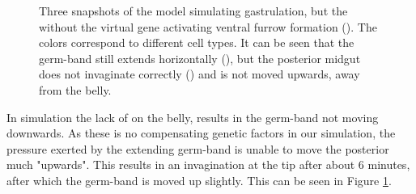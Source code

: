 \begin{figure}[H]
    \centering

    \caption{Three snapshots of the model simulating gastrulation, but the without the virtual gene activating ventral furrow formation (). The colors correspond to different cell types. It can be seen that the germ-band still extends horizontally (), but the posterior midgut does not invaginate correctly () and is not moved upwards, away from the belly.}
    \label{fig:VFmutant}
\end{figure}


In simulation the lack of  on the belly, results in the germ-band not moving downwards. As these is no compensating genetic factors in our simulation, the pressure exerted by the extending germ-band  is unable to move the posterior much "upwards". This results in an invagination at the tip after about 6 minutes, after which the germ-band is moved up slightly. This can be seen in Figure \ref{fig:VFmutant}.\\




